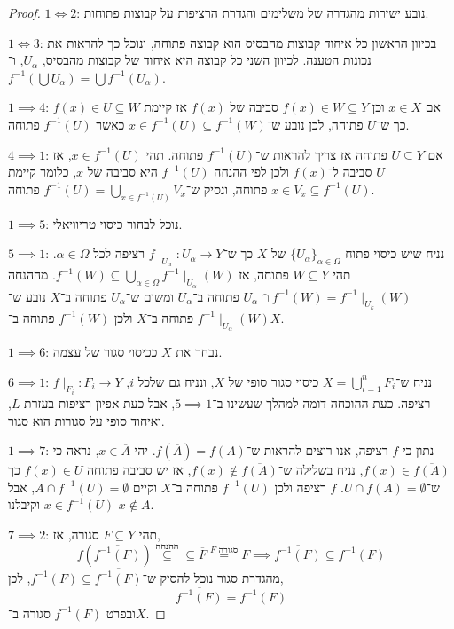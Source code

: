 \begin{proof}
	$1 \iff 2$:
	נובע ישירות מהגדרה של משלימים והגדרת הרציפות על קבוצות פתוחות.

	$1 \iff 3$:
	בכיוון הראשון כל איחוד קבוצות מהבסיס הוא קבוצה פתוחה, ונוכל כך להראות את נכונות הטענה.
	לכיוון השני כל קבוצה היא איחוד של קבוצות מהבסיס, $U_\alpha$, ו־$f^{-1}(\bigcup U_\alpha) = \bigcup f^{-1}(U_\alpha)$.

	$1 \implies 4$:
	אם $x \in X$ וכן $f(x) \in W \subseteq Y$ סביבה של $f(x)$ אז קיימת $f(x) \in U \subseteq W$ כך ש־$U$ פתוחה, לכן נובע ש־$x \in f^{-1}(U) \subseteq f^{-1}(W)$ כאשר $f^{-1}(U)$ פתוחה.

	$4 \implies 1$:
	אם $U \subseteq Y$ פתוחה אז צריך להראות ש־$f^{-1}(U)$ פתוחה.
	תהי $x \in f^{-1}(U)$, אז $U$ סביבה ל־$f(x)$ ולכן לפי ההנחה $f^{-1}(U)$ היא סביבה של $x$, כלומר קיימת $x \in V_x \subseteq f^{-1}(U)$ פתוחה, ונסיק ש־$f^{-1}(U) = \bigcup_{x \in f^{-1}(U)} V_x$ פתוחה.

	$1 \implies 5$:
	נוכל לבחור כיסוי טריוויאלי.

	$5 \implies 1$:
	נניח שיש כיסוי פתוח ${\{U_\alpha\}}_{\alpha \in \Omega}$ של $X$ כך ש־$f \mid_{U_\alpha} : U_\alpha \to Y$ רציפה לכל $\alpha \in \Omega$.
	תהי $W \subseteq Y$ פתוחה, אז $f^{-1}(W) \subseteq \bigcup_{\alpha \in \Omega} f^{-1} \mid_{U_\alpha}(W)$.
	מההנחה $U_\alpha \cap f^{-1}(W) = f^{-1} \mid_{U_k}(W)$ פתוחה ב־$U_\alpha$ ומשום ש־$U_\alpha$ פתוחה ב־$X$ נובע ש־$f^{-1} \mid_{U_\alpha}(W)$ פתוחה ב־$X$ ולכן $f^{-1}(W)$ פתוחה ב־$X$.

	$1 \implies 6$:
	נבחר את $X$ ככיסוי סגור של עצמה.

	$6 \implies 1$:
	נניח ש־$X = \bigcup_{i = 1}^n F_i$ כיסוי סגור סופי של $X$, ונניח גם שלכל $i$, $f \mid_{F_i} : F_i \to Y$ רציפה.
	כעת ההוכחה דומה למהלך שעשינו ב־$5 \implies 1$, אבל כעת אפיון רציפות בעזרת $L$, ואיחוד סופי על סגורות הוא סגור.

	$1 \implies 7$:
	נתון כי $f$ רציפה, אנו רוצים להראות ש־$f(\overline{A}) = \overline{f(A)}$.
	יהי $x \in \overline{A}$, נראה כי $f(x) \in \overline{f(A)}$,
	נניח בשלילה ש־$f(x) \notin \overline{f(A)}$, אז יש סביבה פתוחה $f(x) \in U$ כך ש־$U \cap f(A) = \emptyset$.
	$f$ רציפה ולכן $f^{-1}(U)$ פתוחה ב־$X$ וקיים $A \cap f^{-1}(U) = \emptyset$,
	אבל $x \in f^{-1}(U)$ וקיבלנו $x \notin \overline{A}$.

	$7 \implies 2$:
	תהי $F \subseteq Y$ סגורה, אז,
	\[
		f(\overline{f^{-1}(F)})
		\overset{\text{ההנחה}}{\subseteq}
		\subseteq \overline{F}
		\overset{\text{$F$ סגורה}}{=} F
		\implies \overline{f^{-1}(F)}
		\subseteq f^{-1}(F)
	\]
	מהגדרת סגור נוכל להסיק ש־$f^{-1}(F) \subseteq \overline{f^{-1}(F)}$, לכן,
	\[
		\overline{f^{-1}(F)}
		= f^{-1}(F)
	\]
	ובפרט $f^{-1}(F)$ סגורה ב־$X$.
\end{proof}
